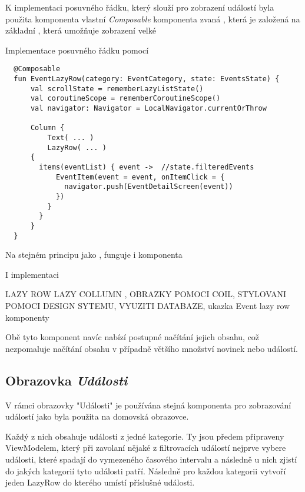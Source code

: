 K implementaci posuvného řádku, který slouží pro zobrazení událostí byla použita komponenta vlastní \textit{Composable} komponenta zvaná ,
která je založená na základní , která umožňuje zobrazení velké
\begin{listing}[H]
\caption{Implementace posuvného řádku pomocí }\label{lst:EventLazyRowImpl}
\begin{verbatim}
  @Composable
  fun EventLazyRow(category: EventCategory, state: EventsState) {
      val scrollState = rememberLazyListState()
      val coroutineScope = rememberCoroutineScope()
      val navigator: Navigator = LocalNavigator.currentOrThrow
  
      Column {
          Text( ... )
          LazyRow( ... ) 
      {  
        items(eventList) { event ->  //state.filteredEvents
            EventItem(event = event, onItemClick = {
              navigator.push(EventDetailScreen(event))
            })
          }
        }
      }
  }
\end{verbatim}
\end{listing}

Na stejném principu jako , funguje i komponenta 

I implementaci 

LAZY ROW LAZY COLLUMN , OBRAZKY POMOCI COIL, STYLOVANI POMOCI DESIGN SYTEMU, VYUZITI DATABAZE, ukazka Event lazy row komponenty

Obě tyto komponent navíc nabízí postupné načítání jejich obsahu, což nezpomaluje načítání obsahu v případně většího množství novinek
nebo událostí.

\subsection{Obrazovka \textit{Události}}

V rámci obrazovky "Události" je používána stejná komponenta pro zobrazování událostí jako byla použita na domovská obrazovce. 


Každý z nich obsahuje události z jedné kategorie. Ty jsou předem připraveny ViewModelem, který při zavolaní nějaké z filtrovacích
událostí nejprve vybere události, které spadají do vymezeného časového intervalu a následně u nich zjistí do jakých kategorií tyto
události patří. Následně pro každou kategorii vytvoří jeden LazyRow do kterého umístí příslušné události.


